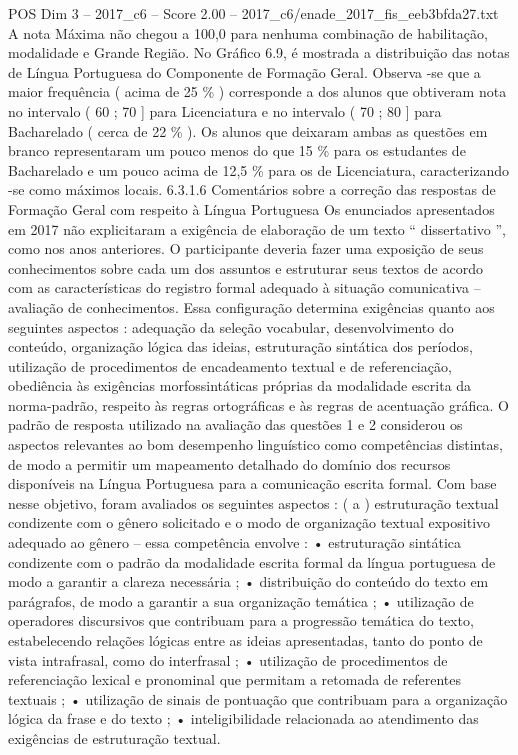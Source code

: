 \begin{textsample}{POS Dim 3 – 2017\_c6 – Score 2.00 – 2017\_c6/enade\_2017\_fis\_eeb3bfda27.txt}
A nota Máxima não chegou a 100,0 para nenhuma combinação de habilitação, modalidade e Grande Região.
No Gráfico 6.9, é mostrada a distribuição das notas de Língua Portuguesa do Componente de Formação Geral.
Observa -se que a maior frequência ( acima de 25 \% ) corresponde a dos alunos que obtiveram nota no intervalo ( 60 ; 70 ] para Licenciatura e no intervalo ( 70 ; 80 ] para Bacharelado ( cerca de 22 \% ).
Os alunos que deixaram ambas as questões em branco representaram um pouco menos do que 15 \% para os estudantes de Bacharelado e um pouco acima de 12,5 \% para os de Licenciatura, caracterizando -se como máximos locais. 6.3.1.6 Comentários sobre a correção das respostas de Formação Geral com respeito à Língua Portuguesa Os enunciados apresentados em 2017 não explicitaram a exigência de elaboração de um texto “ dissertativo ”, como nos anos anteriores.
O participante deveria fazer uma exposição de seus conhecimentos sobre cada um dos assuntos e estruturar seus textos de acordo com as características do registro formal adequado à situação comunicativa – avaliação de conhecimentos.
Essa configuração determina exigências quanto aos seguintes aspectos : adequação da seleção vocabular, desenvolvimento do conteúdo, organização lógica das ideias, estruturação sintática dos períodos, utilização de procedimentos de encadeamento textual e de referenciação, obediência às exigências morfossintáticas próprias da modalidade escrita da norma-padrão, respeito às regras ortográficas e às regras de acentuação gráfica.
O padrão de resposta utilizado na avaliação das questões 1 e 2 considerou os aspectos relevantes ao bom desempenho linguístico como competências distintas, de modo a permitir um mapeamento detalhado do domínio dos recursos disponíveis na Língua Portuguesa para a comunicação escrita formal.
Com base nesse objetivo, foram avaliados os seguintes aspectos : ( a ) estruturação textual condizente com o gênero solicitado e o modo de organização textual expositivo adequado ao gênero – essa competência envolve : • estruturação sintática condizente com o padrão da modalidade escrita formal da língua portuguesa de modo a garantir a clareza necessária ; • distribuição do conteúdo do texto em parágrafos, de modo a garantir a sua organização temática ; • utilização de operadores discursivos que contribuam para a progressão temática do texto, estabelecendo relações lógicas entre as ideias apresentadas, tanto do ponto de vista intrafrasal, como do interfrasal ; • utilização de procedimentos de referenciação lexical e pronominal que permitam a retomada de referentes textuais ; • utilização de sinais de pontuação que contribuam para a organização lógica da frase e do texto ; • inteligibilidade relacionada ao atendimento das exigências de estruturação textual.

\end{textsample}
